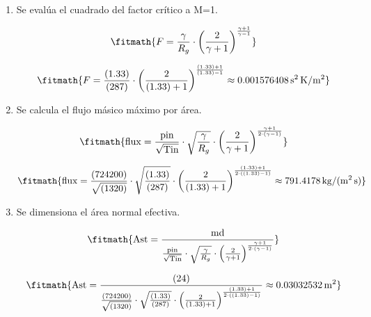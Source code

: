 \begin{enumerate}

\item Se evalúa el cuadrado del factor crítico a M=1.

\[\fitmath{F=\frac{\gamma}{R_g}\cdot {\left(\frac{2}{\gamma+1}\right)}^{\frac{\gamma+1}{\gamma-1}}}\]

\[\fitmath{F=\frac{(1.33)}{(287)}\cdot {\left(\frac{2}{(1.33)+1}\right)}^{\frac{(1.33)+1}{(1.33)-1}}\approx 0.001576408\,\mathrm{s^{2}\,K/m^{2}}}\]

\item Se calcula el flujo másico máximo por área.

\[\fitmath{\mathrm{flux}=\frac{\mathrm{pin}}{\sqrt{\mathrm{Tin}}}\cdot \sqrt{\frac{\gamma}{R_g}}\cdot {\left(\frac{2}{\gamma+1}\right)}^{\frac{\gamma+1}{2\cdot \left(\gamma-1\right)}}}\]

\[\fitmath{\mathrm{flux}=\frac{(724200)}{\sqrt{(1320)}}\cdot \sqrt{\frac{(1.33)}{(287)}}\cdot {\left(\frac{2}{(1.33)+1}\right)}^{\frac{(1.33)+1}{2\cdot \left((1.33)-1\right)}}\approx 791.4178\,\mathrm{kg/(m^{2}\,s)}}\]

\item Se dimensiona el área normal efectiva.

\[\fitmath{\mathrm{Ast}=\frac{\mathrm{md}}{\frac{\mathrm{pin}}{\sqrt{\mathrm{Tin}}}\cdot \sqrt{\frac{\gamma}{R_g}}\cdot {\left(\frac{2}{\gamma+1}\right)}^{\frac{\gamma+1}{2\cdot \left(\gamma-1\right)}}}}\]

\[\fitmath{\mathrm{Ast}=\frac{(24)}{\frac{(724200)}{\sqrt{(1320)}}\cdot \sqrt{\frac{(1.33)}{(287)}}\cdot {\left(\frac{2}{(1.33)+1}\right)}^{\frac{(1.33)+1}{2\cdot \left((1.33)-1\right)}}}\approx 0.03032532\,\mathrm{m^{2}}}\]

\end{enumerate}
